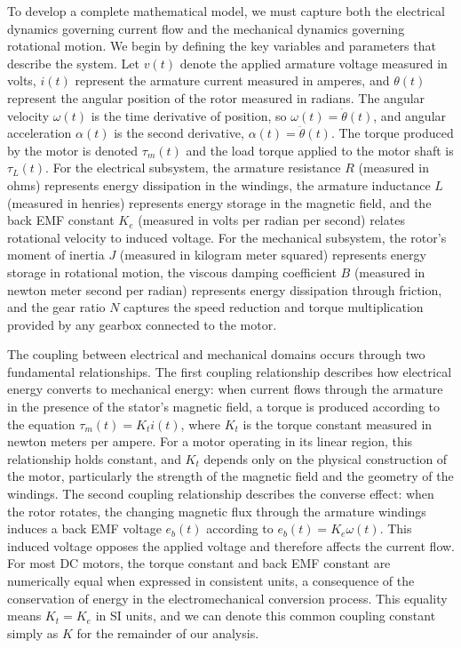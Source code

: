 To develop a complete mathematical model, we must capture both the electrical dynamics governing current flow and the mechanical dynamics governing rotational motion. We begin by defining the key variables and parameters that describe the system. Let $v(t)$ denote the applied armature voltage measured in volts, $i(t)$ represent the armature current measured in amperes, and $\theta(t)$ represent the angular position of the rotor measured in radians. The angular velocity $\omega(t)$ is the time derivative of position, so $\omega(t) = \dot{\theta}(t)$, and angular acceleration $\alpha(t)$ is the second derivative, $\alpha(t) = \ddot{\theta}(t)$. The torque produced by the motor is denoted $\tau_m(t)$ and the load torque applied to the motor shaft is $\tau_L(t)$. For the electrical subsystem, the armature resistance $R$ (measured in ohms) represents energy dissipation in the windings, the armature inductance $L$ (measured in henries) represents energy storage in the magnetic field, and the back EMF constant $K_e$ (measured in volts per radian per second) relates rotational velocity to induced voltage. For the mechanical subsystem, the rotor's moment of inertia $J$ (measured in kilogram meter squared) represents energy storage in rotational motion, the viscous damping coefficient $B$ (measured in newton meter second per radian) represents energy dissipation through friction, and the gear ratio $N$ captures the speed reduction and torque multiplication provided by any gearbox connected to the motor.

The coupling between electrical and mechanical domains occurs through two fundamental relationships. The first coupling relationship describes how electrical energy converts to mechanical energy: when current flows through the armature in the presence of the stator's magnetic field, a torque is produced according to the equation $\tau_m(t) = K_t i(t)$, where $K_t$ is the torque constant measured in newton meters per ampere. For a motor operating in its linear region, this relationship holds constant, and $K_t$ depends only on the physical construction of the motor, particularly the strength of the magnetic field and the geometry of the windings. The second coupling relationship describes the converse effect: when the rotor rotates, the changing magnetic flux through the armature windings induces a back EMF voltage $e_b(t)$ according to $e_b(t) = K_e \omega(t)$. This induced voltage opposes the applied voltage and therefore affects the current flow. For most DC motors, the torque constant and back EMF constant are numerically equal when expressed in consistent units, a consequence of the conservation of energy in the electromechanical conversion process. This equality means $K_t = K_e$ in SI units, and we can denote this common coupling constant simply as $K$ for the remainder of our analysis.

